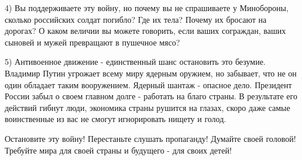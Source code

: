 4) Вы поддерживаете эту войну, но почему вы не спрашиваете у Минобороны,
сколько российских солдат погибло? Где их тела? Почему их бросают на дорогах? О
каком величии вы можете говорить, если ваших сограждан, ваших сыновей и мужей
превращают в пушечное мясо?

5) Антивоенное движение - единственный шанс остановить это безумие. Владимир
Путин угрожает всему миру ядерным оружием, но забывает, что не он один обладает
таким вооружением. Ядерный шантаж - опасное дело. Президент России забыл о
своем главном долге - работать на благо страны. В результате его действий
гибнут люди, экономика страны рушится на глазах, скоро даже самые воинственные
из вас не смогут игнорировать нищету и голод.

Остановите эту войну! Перестаньте слушать пропаганду! Думайте своей головой!
Требуйте мира для своей страны и будущего - для своих детей!
